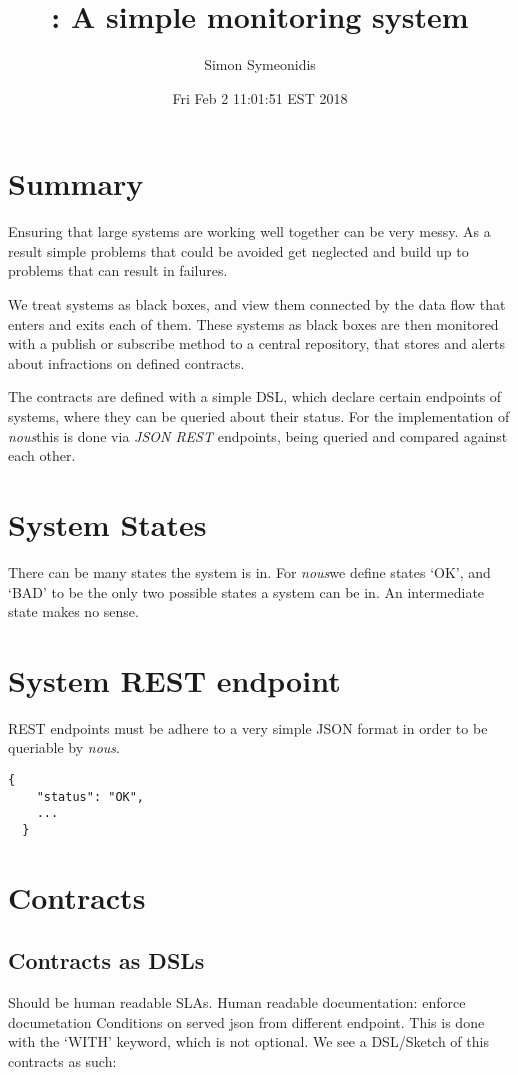 \documentclass[12pt,twoside]{article}
\title{\projectname: A simple monitoring system}
\author{Simon Symeonidis}
\date{Fri Feb  2 11:01:51 EST 2018}
\newcommand{\projectname}[0]{\textit{nous}}
\begin{document}
\maketitle
\tableofcontents
\listoffigures
\lstlistoflistings



\section{Summary}
Ensuring that large systems are working well together can be
very messy. As a result simple problems that could be avoided
get neglected and build up to problems that can result in
failures.

We treat systems as black boxes, and view them connected by
the data flow that enters and exits each of them. These systems as
black boxes are then monitored with a publish or subscribe method to a
central repository, that stores and alerts about infractions on
defined contracts.

The contracts are defined with a simple DSL, which declare certain
endpoints of systems, where they can be queried about their
status. For the implementation of \projectname this is done via
\textit{JSON REST} endpoints, being queried and compared against each
other.

\section{System States}
There can be many states the system is in. For \projectname we define
states `OK', and `BAD' to be the only two possible states a system can
be in. An intermediate state makes no sense.

\section{System REST endpoint}

REST endpoints must be adhere to a very simple JSON format in order to
be queriable by \projectname.
\begin{lstlisting}[caption='Sample REST endpoint]
  {
    "status": "OK",
    ...
  }
\end{lstlisting}

\section{Contracts}
\subsection{Contracts as DSLs}
Should be human readable SLAs. Human readable documentation: enforce
documetation Conditions on served json from different endpoint. This
is done with the `WITH' keyword, which is not optional. We see a
DSL/Sketch of this contracts as such:
\end{document}
